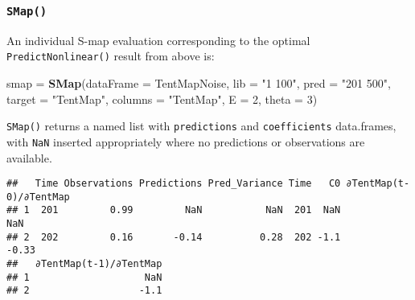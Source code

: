 \documentclass[]{article}
\newenvironment{Shaded}{\begin{snugshade}}{\end{snugshade}}
\newcommand{\DataTypeTok}[1]{\textcolor[rgb]{0.13,0.29,0.53}{#1}}
\newcommand{\DecValTok}[1]{\textcolor[rgb]{0.00,0.00,0.81}{#1}}
\newcommand{\KeywordTok}[1]{\textcolor[rgb]{0.13,0.29,0.53}{\textbf{#1}}}
\newcommand{\NormalTok}[1]{#1}
\newcommand{\OperatorTok}[1]{\textcolor[rgb]{0.81,0.36,0.00}{\textbf{#1}}}
\newcommand{\StringTok}[1]{\textcolor[rgb]{0.31,0.60,0.02}{#1}}
\begin{document}
\hypertarget{smap}{%
\subsubsection{\texorpdfstring{\texttt{SMap()}}{SMap()}}\label{smap}}

An individual S-map evaluation corresponding to the optimal
\texttt{PredictNonlinear()} result from above is:

\begin{Shaded}
\begin{Highlighting}[]
\NormalTok{smap =}\StringTok{ }\KeywordTok{SMap}\NormalTok{(}\DataTypeTok{dataFrame =}\NormalTok{ TentMapNoise, }\DataTypeTok{lib =} \StringTok{"1 100"}\NormalTok{, }\DataTypeTok{pred =} \StringTok{"201 500"}\NormalTok{, }\DataTypeTok{target =} \StringTok{"TentMap"}\NormalTok{, }
    \DataTypeTok{columns =} \StringTok{"TentMap"}\NormalTok{, }\DataTypeTok{E =} \DecValTok{2}\NormalTok{, }\DataTypeTok{theta =} \DecValTok{3}\NormalTok{)}
\end{Highlighting}
\end{Shaded}

\texttt{SMap()} returns a named list with \texttt{predictions} and
\texttt{coefficients} data.frames, with \texttt{NaN} inserted
appropriately where no predictions or observations are available.

\begin{Shaded}
\end{Shaded}

\begin{verbatim}
##   Time Observations Predictions Pred_Variance Time   C0 ∂TentMap(t-0)/∂TentMap
## 1  201         0.99         NaN           NaN  201  NaN                    NaN
## 2  202         0.16       -0.14          0.28  202 -1.1                  -0.33
##   ∂TentMap(t-1)/∂TentMap
## 1                    NaN
## 2                   -1.1
\end{verbatim}

\begin{Shaded}
\end{Shaded}
\end{document}
